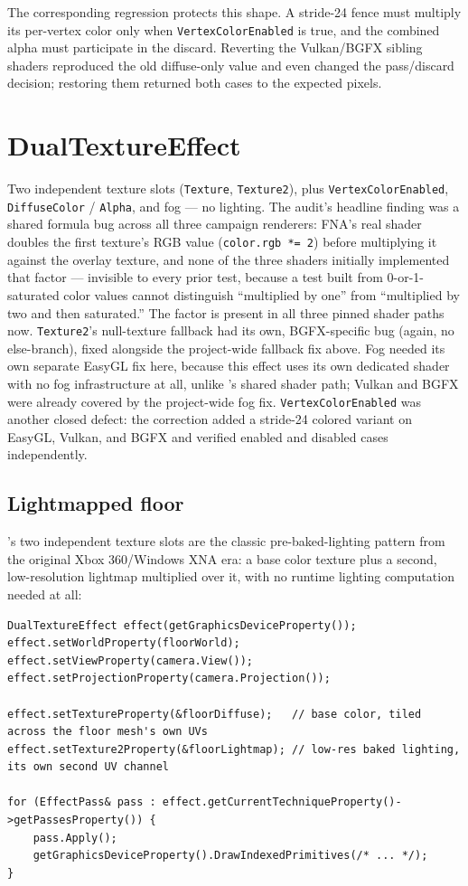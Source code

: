 The corresponding regression protects this shape. A stride-24
 fence must multiply its per-vertex color only when
\texttt{VertexColorEnabled} is true, and the combined alpha must participate in the discard.
Reverting the Vulkan/BGFX sibling shaders reproduced the old diffuse-only value and even changed
the pass/discard decision; restoring them returned both cases to the expected pixels.

\section{DualTextureEffect}

Two independent texture slots (\texttt{Texture}, \texttt{Texture2}), plus
\texttt{VertexColorEnabled}, \texttt{DiffuseColor} / \texttt{Alpha}, and fog --- no lighting.
The audit's headline finding was a shared formula bug across all three campaign renderers:
FNA's real shader doubles the first texture's RGB value (\texttt{color.rgb *= 2}) before
multiplying it against the overlay texture, and none of the three shaders initially
implemented that factor --- invisible to every prior test, because a test built from
0-or-1-saturated color values cannot distinguish ``multiplied by one'' from ``multiplied by
two and then saturated.'' The factor is present in all three pinned shader paths now.
\texttt{Texture2}'s null-texture fallback had its own,
BGFX-specific bug (again, no else-branch), fixed alongside the project-wide fallback fix
above. Fog needed its own separate EasyGL fix here, because this effect uses its own
dedicated shader with no fog infrastructure at all, unlike 's
shared shader path; Vulkan and BGFX were already covered by the project-wide fog fix.
\texttt{VertexColorEnabled} was another closed defect: the correction added a stride-24 colored
variant on EasyGL, Vulkan, and BGFX and verified enabled and disabled cases independently.

\subsection{Lightmapped floor}

's two independent texture slots are the classic pre-baked-lighting
pattern from the original Xbox 360/Windows XNA era: a base color texture plus a second,
low-resolution lightmap multiplied over it, with no runtime lighting computation needed at all:

\begin{lstlisting}
DualTextureEffect effect(getGraphicsDeviceProperty());
effect.setWorldProperty(floorWorld);
effect.setViewProperty(camera.View());
effect.setProjectionProperty(camera.Projection());

effect.setTextureProperty(&floorDiffuse);   // base color, tiled across the floor mesh's own UVs
effect.setTexture2Property(&floorLightmap); // low-res baked lighting, its own second UV channel

for (EffectPass& pass : effect.getCurrentTechniqueProperty()->getPassesProperty()) {
    pass.Apply();
    getGraphicsDeviceProperty().DrawIndexedPrimitives(/* ... */);
}
\end{lstlisting}

